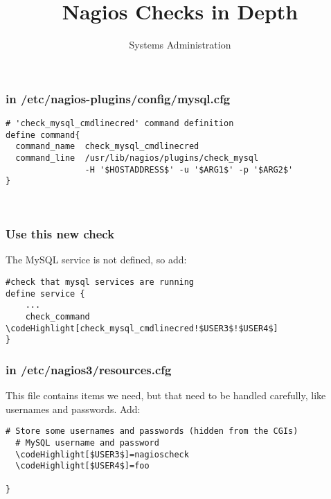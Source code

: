\documentclass[10pt]{beamer}
\title{Nagios Checks in Depth}
\author[IN719]{Systems Administration}
\institute[Otago Polytechnic]{
  School of Information Technology \\
  Otago Polytechnic \\
  Dunedin, New Zealand \\
}
\date{}
\newcommand\codeHighlight[1]{\textcolor[rgb]{1,0,0}{\textbf{#1}}}
\begin{document}
\begin{frame}[plain]
  \titlepage
\end{frame}


\begin{frame}[fragile]
  \frametitle{in /etc/nagios-plugins/config/mysql.cfg}

\begin{Verbatim}[commandchars=\\\[\]]
# 'check_mysql_cmdlinecred' command definition
define command{
  command_name  check_mysql_cmdlinecred
  command_line  /usr/lib/nagios/plugins/check_mysql
                -H '$HOSTADDRESS$' -u '$ARG1$' -p '$ARG2$'
}



\end{Verbatim}
\end{frame}
\begin{frame}[fragile]
  \frametitle{Use this new check}

The MySQL service is not defined, so add:
\begin{Verbatim}[commandchars=\\\[\]]
#check that mysql services are running
define service {
	...
    check_command         \codeHighlight[check_mysql_cmdlinecred!$USER3$!$USER4$]
}

\end{Verbatim}
\end{frame}

\begin{frame}[fragile]
  \frametitle{in /etc/nagios3/resources.cfg}

This file contains items we need, but that need to be handled carefully, like
usernames and passwords.  Add:

\begin{Verbatim}[commandchars=\\\[\]]
  # Store some usernames and passwords (hidden from the CGIs)
  # MySQL username and password
  \codeHighlight[$USER3$]=nagioscheck
  \codeHighlight[$USER4$]=foo

}
\end{Verbatim}
\end{frame}
\end{document}
